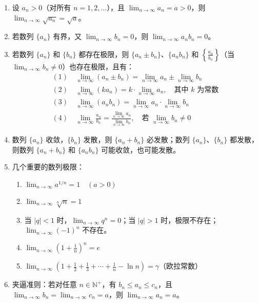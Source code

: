 \documentclass[UTF8]{ctexart}
\theoremstyle{remark}
\begin{document}
\begin{enumerate}
			\item 设 $ a_n > 0 $（对所有 $ n = 1, 2, \dots $），且 $ \lim_{n \to \infty} a_n = a > 0 $，则 $ \lim_{n \to \infty} \sqrt{a_n} = \sqrt{a} $。
			
			\item 若数列 $ \{a_n\} $ 有界，又 $ \lim_{n \to \infty} b_n = 0 $，则 $ \lim_{n \to \infty} a_n b_n = 0 $。
			
			\item 若数列 $ \{a_n\} $ 和 $ \{b_n\} $ 都存在极限，则 $ \{a_n \pm b_n\} $、$ \{a_n b_n\} $ 和 $ \left\{\frac{a_n}{b_n}\right\} $（当 $ \lim_{n \to \infty} b_n \ne 0 $）也存在极限，且有：
			\begin{align*}
				(1)\ & \lim_{n \to \infty}(a_n \pm b_n) = \lim_{n \to \infty} a_n \pm \lim_{n \to \infty} b_n \\
				(2)\ & \lim_{n \to \infty}(k a_n) = k \cdot \lim_{n \to \infty} a_n,\quad \text{其中 } k \text{ 为常数} \\
				(3)\ & \lim_{n \to \infty}(a_n b_n) = \lim_{n \to \infty} a_n \cdot \lim_{n \to \infty} b_n \\
				(4)\ & \lim_{n \to \infty} \frac{a_n}{b_n} = \frac{\lim_{n \to \infty} a_n}{\lim_{n \to \infty} b_n},\quad \text{若 } \lim_{n \to \infty} b_n \ne 0
			\end{align*}
			
			\item 数列 $ \{a_n\} $ 收敛，$ \{b_n\} $ 发散，则 $ \{a_n + b_n\} $ 必发散；数列 $ \{a_n\} $、$ \{b_n\} $ 都发散，则数列 $ \{a_n + b_n\} $ 和 $ \{a_n b_n\} $ 可能收敛，也可能发散。
			
			\item 几个重要的数列极限：
			\begin{enumerate}
				\item $ \lim_{n \to \infty} a^{1/n} = 1 \quad (a > 0) $
				\item $ \lim_{n \to \infty} \sqrt[n]{n} = 1 $
				\item 当 $ |q| < 1 $ 时，$ \lim_{n \to \infty} q^n = 0 $；当 $ |q| > 1 $ 时，极限不存在；$ \lim_{n \to \infty} (-1)^n $ 不存在。
				\item $ \lim_{n \to \infty} \left(1 + \frac{1}{n}\right)^n = e $
				\item $ \lim_{n \to \infty} \left(1 + \frac{1}{2} + \frac{1}{3} + \cdots + \frac{1}{n} - \ln n\right) = \gamma $（欧拉常数）
			\end{enumerate}
			
			\item 夹逼准则：若对任意 $ n \in \mathbb{N}^+ $，有 $ b_n \leq a_n \leq c_n $，且 $ \lim_{n \to \infty} b_n = \lim_{n \to \infty} c_n = a $，则 $ \lim_{n \to \infty} a_n = a $。
			

\end{enumerate}
\end{document}
